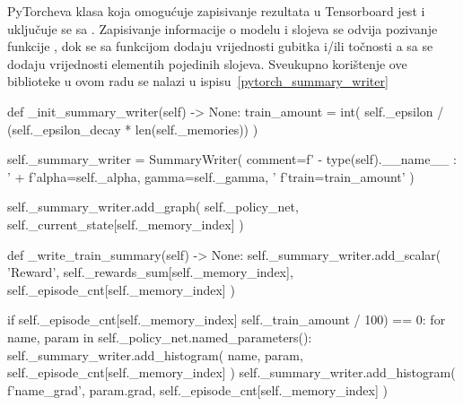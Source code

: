 PyTorcheva klasa koja omogućuje zapisivanje rezultata u Tensorboard jest  i uključuje se sa . Zapisivanje informacije o modelu i slojeva se odvija pozivanje funkcije , dok se sa funkcijom  dodaju vrijednosti gubitka i/ili točnosti a sa  se dodaju vrijednosti elementih pojedinih slojeva. Sveukupno korištenje ove biblioteke u ovom radu se nalazi u ispisu~\ref{pytorch_summary_writer}
\begin{python}[caption={Korištenje Pytorch SummaryWriter}, label=pytorch_summary_writer, escapechar=\#]
def _init_summary_writer(self) -> None:
    train_amount = int(
        self._epsilon / (self._epsilon_decay * len(self._memories))
    )
    
    self._summary_writer = SummaryWriter(
        comment=f' - {type(self).__name__} : ' +
                f'alpha={self._alpha}, gamma={self._gamma}, '
                f'train={train_amount}'
    )
    
    self._summary_writer.add_graph(
        self._policy_net, 
        self._current_state[self._memory_index]
    )
    
def _write_train_summary(self) -> None:
    self._summary_writer.add_scalar(
        'Reward', self._rewards_sum[self._memory_index],
        self._episode_cnt[self._memory_index]
    )

    if self._episode_cnt[self._memory_index] %
            self._train_amount / 100) == 0:
        for name, param in self._policy_net.named_parameters():
            self._summary_writer.add_histogram(
                name, param, self._episode_cnt[self._memory_index]
            )
            self._summary_writer.add_histogram(
                f'{name}_grad', param.grad, 
                self._episode_cnt[self._memory_index]
            )
\end{python}

